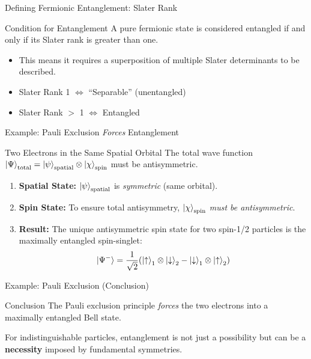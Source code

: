 \begin{frame}{Defining Fermionic Entanglement: Slater Rank}
  \begin{alertblock}{Condition for Entanglement}
    A pure fermionic state is considered \alert{entangled if and only if
    its Slater rank is greater than one}.
    \pause
    \begin{itemize}
      \item This means it requires a superposition of multiple Slater
        determinants to be described.
      \item Slater Rank 1 $\iff$ ``Separable'' (unentangled)
      \item Slater Rank $>$ 1 $\iff$ Entangled
    \end{itemize}
  \end{alertblock}
\end{frame}

\begin{frame}{Example: Pauli Exclusion \emph{Forces} Entanglement}
  \begin{block}{Two Electrons in the Same Spatial Orbital}
    The total wave function $\ket{\Psi}_{\text{total}} =
    \ket{\psi}_{\text{spatial}} \otimes \ket{\chi}_{\text{spin}}$ must be
    antisymmetric.
    \begin{enumerate}[<+->]
      \item \textbf{Spatial State:} $\ket{\psi}_{\text{spatial}}$ is
        \emph{symmetric} (same orbital).
      \item \textbf{Spin State:} To ensure total antisymmetry,
        $\ket{\chi}_{\text{spin}}$ \emph{must be antisymmetric}.
      \item \textbf{Result:} The unique antisymmetric spin state for two
        spin-1/2 particles is the maximally entangled \alert{spin-singlet}:
        \[
          \ket{\Psi^-} = \frac{1}{\sqrt{2}} (\ket{\uparrow}_1 \otimes
          \ket{\downarrow}_2 - \ket{\downarrow}_1 \otimes \ket{\uparrow}_2)
        \]
    \end{enumerate}
  \end{block}
\end{frame}

\begin{frame}{Example: Pauli Exclusion (Conclusion)}
  \begin{alertblock}{Conclusion}
    The Pauli exclusion principle \emph{forces} the two electrons into a
    maximally entangled Bell state.
    \pause
    \begin{center}
    For indistinguishable particles, entanglement is not just a possibility
    but can be a \textbf{necessity} imposed by fundamental symmetries.
    \end{center}
  \end{alertblock}
\end{frame}

